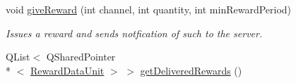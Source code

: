 \begin{DoxyCompactItemize}
void \hyperlink{class_picto_1_1_engine_1_1_picto_engine_a3a3557d928df88b0132a1f36fbfc78ce}{give\-Reward} (int channel, int quantity, int min\-Reward\-Period)
\begin{DoxyCompactList}\small\item\em Issues a reward and sends notfication of such to the server. \end{DoxyCompactList}\item 
\hypertarget{class_picto_1_1_engine_1_1_picto_engine_acb68c62a14fd2a7228a683e2bb55eab9}{Q\-List$<$ Q\-Shared\-Pointer\\*
$<$ \hyperlink{class_picto_1_1_reward_data_unit}{Reward\-Data\-Unit} $>$ $>$ \hyperlink{class_picto_1_1_engine_1_1_picto_engine_acb68c62a14fd2a7228a683e2bb55eab9}{get\-Delivered\-Rewards} ()}\label{class_picto_1_1_engine_1_1_picto_engine_acb68c62a14fd2a7228a683e2bb55eab9}


\end{DoxyCompactItemize}
